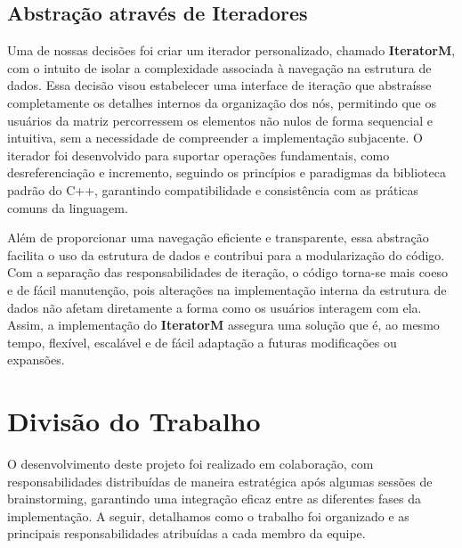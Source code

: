 \documentclass[12pt]{article}
\begin{document}
    \subsection{Abstração através de Iteradores}
        Uma de nossas decisões foi criar um iterador personalizado, chamado \textbf{IteratorM}, com o intuito de isolar a complexidade associada à navegação na estrutura de dados. Essa decisão visou estabelecer uma interface de iteração que abstraísse completamente os detalhes internos da organização dos nós, permitindo que os usuários da matriz percorressem os elementos não nulos de forma sequencial e intuitiva, sem a necessidade de compreender a implementação subjacente. O iterador foi desenvolvido para suportar operações fundamentais, como desreferenciação e incremento, seguindo os princípios e paradigmas da biblioteca padrão do C++, garantindo compatibilidade e consistência com as práticas comuns da linguagem.

        Além de proporcionar uma navegação eficiente e transparente, essa abstração facilita o uso da estrutura de dados e contribui para a modularização do código. Com a separação das responsabilidades de iteração, o código torna-se mais coeso e de fácil manutenção, pois alterações na implementação interna da estrutura de dados não afetam diretamente a forma como os usuários interagem com ela. Assim, a implementação do \textbf{IteratorM} assegura uma solução que é, ao mesmo tempo, flexível, escalável e de fácil adaptação a futuras modificações ou expansões.

\section{Divisão do Trabalho}
O desenvolvimento deste projeto foi realizado em colaboração, com responsabilidades distribuídas de maneira estratégica após algumas sessões de brainstorming, garantindo uma integração eficaz entre as diferentes fases da implementação. A seguir, detalhamos como o trabalho foi organizado e as principais responsabilidades atribuídas a cada membro da equipe.
\end{document}
